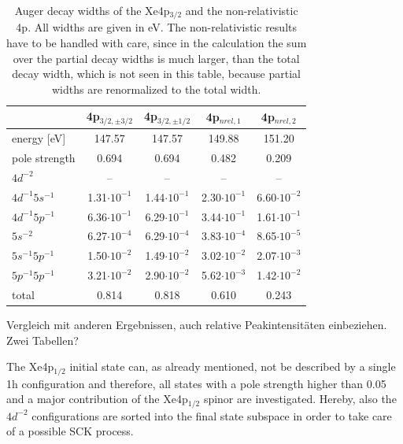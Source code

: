 \begin{table}[h]
 \centering
 \caption{Auger decay widths of the Xe4p$_{3/2}$ and the non-relativistic
          4p. All widths are given in \unit{eV}. The non-relativistic
          results have to be handled with care, since in the calculation
          the sum over the partial decay widths is much larger, than the
          total decay width, which is not seen in this table, because
          partial widths are renormalized to the total width.}
 \begin{tabular}{lcccc}
   \toprule
                      & 4p$_{3/2,\pm 3/2}$ & 4p$_{3/2,\pm 1/2}$ & 4p$_{nrel,1}$  & 4p$_{nrel,2}$ \\
   \midrule                                                                                     
   energy [\unit{eV}] &   147.57           &    147.57          &  149.88        &   151.20    \\
   pole strength       &     0.694          &      0.694         &    0.482       &     0.209   \\
   \midrule                                                                                    
   $4d^{-2}$          &      --            &        --          &       --       &     --        \\
   $4d^{-1}5s^{-1}$   & 1.31$\cdot10^{-1}$ & 1.44$\cdot10^{-1}$ & 2.30$\cdot10^{-1}$ & 6.60$\cdot10^{-2}$\\
   $4d^{-1}5p^{-1}$   & 6.36$\cdot10^{-1}$ & 6.29$\cdot10^{-1}$ & 3.44$\cdot10^{-1}$ & 1.61$\cdot10^{-1}$\\
   $5s^{-2}$          & 6.27$\cdot10^{-4}$ & 6.29$\cdot10^{-4}$ & 3.83$\cdot10^{-4}$ & 8.65$\cdot10^{-5}$\\
   $5s^{-1}5p^{-1}$   & 1.50$\cdot10^{-2}$ & 1.49$\cdot10^{-2}$ & 3.02$\cdot10^{-2}$ & 2.07$\cdot10^{-3}$\\
   $5p^{-1}5p^{-1}$   & 3.21$\cdot10^{-2}$ & 2.90$\cdot10^{-2}$ & 5.62$\cdot10^{-3}$ & 1.42$\cdot10^{-2}$\\
   \midrule
   total              &   0.814            &   0.818            &  0.610         &   0.243     \\
   \bottomrule
 \end{tabular}
 \label{table:xe_auger_rest}
\end{table}

Vergleich mit anderen Ergebnissen, auch relative Peakintensitäten einbeziehen.
Zwei Tabellen?



The Xe4p$_{1/2}$ initial state can, as already mentioned, not be described
by a single 1h configuration and therefore, all states with a pole strength
higher than 0.05 and a major contribution of the Xe4p$_{1/2}$ spinor are
investigated. Hereby, also the $4d^{-2}$ configurations are sorted into the
final state subspace in order to take care of a possible \ac{SCK} process.

